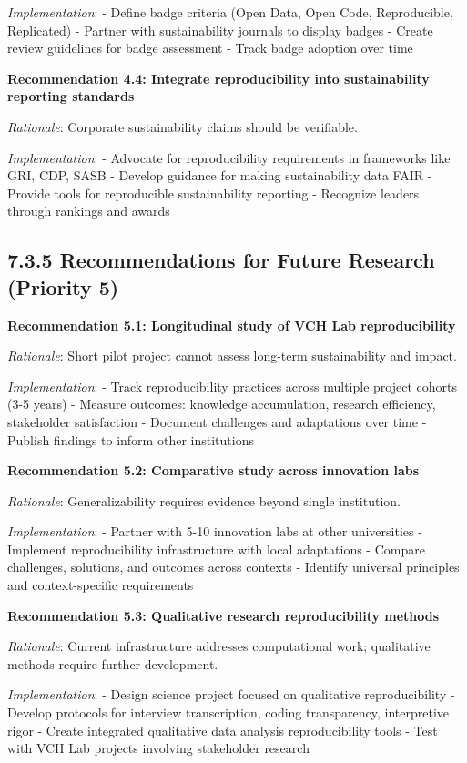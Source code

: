 \documentclass[
  oneside,
  open=any]{scrbook}
\begin{document}
\emph{Implementation}: - Define badge criteria (Open Data, Open Code,
Reproducible, Replicated) - Partner with sustainability journals to
display badges - Create review guidelines for badge assessment - Track
badge adoption over time

\textbf{Recommendation 4.4: Integrate reproducibility into
sustainability reporting standards}

\emph{Rationale}: Corporate sustainability claims should be verifiable.

\emph{Implementation}: - Advocate for reproducibility requirements in
frameworks like GRI, CDP, SASB - Develop guidance for making
sustainability data FAIR - Provide tools for reproducible sustainability
reporting - Recognize leaders through rankings and awards

\subsection{7.3.5 Recommendations for Future Research (Priority
5)}\label{recommendations-for-future-research-priority-5}

\textbf{Recommendation 5.1: Longitudinal study of VCH Lab
reproducibility}

\emph{Rationale}: Short pilot project cannot assess long-term
sustainability and impact.

\emph{Implementation}: - Track reproducibility practices across multiple
project cohorts (3-5 years) - Measure outcomes: knowledge accumulation,
research efficiency, stakeholder satisfaction - Document challenges and
adaptations over time - Publish findings to inform other institutions

\textbf{Recommendation 5.2: Comparative study across innovation labs}

\emph{Rationale}: Generalizability requires evidence beyond single
institution.

\emph{Implementation}: - Partner with 5-10 innovation labs at other
universities - Implement reproducibility infrastructure with local
adaptations - Compare challenges, solutions, and outcomes across
contexts - Identify universal principles and context-specific
requirements

\textbf{Recommendation 5.3: Qualitative research reproducibility
methods}

\emph{Rationale}: Current infrastructure addresses computational work;
qualitative methods require further development.

\emph{Implementation}: - Design science project focused on qualitative
reproducibility - Develop protocols for interview transcription, coding
transparency, interpretive rigor - Create integrated qualitative data
analysis reproducibility tools - Test with VCH Lab projects involving
stakeholder research
\end{document}
